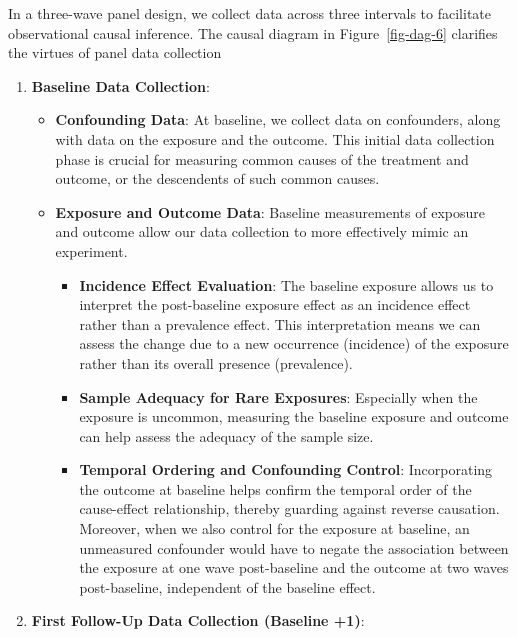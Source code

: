 \documentclass[
  singlecolumn]{article}
\begin{document}
In a three-wave panel design, we collect data across three intervals to
facilitate observational causal inference. The causal diagram in
Figure~\ref{fig-dag-6} clarifies the virtues of panel data collection

\begin{enumerate}
\def\labelenumi{\arabic{enumi}.}
\item
  \textbf{Baseline Data Collection}:

  \begin{itemize}
  \item
    \textbf{Confounding Data}: At baseline, we collect data on
    confounders, along with data on the exposure and the outcome. This
    initial data collection phase is crucial for measuring common causes
    of the treatment and outcome, or the descendents of such common
    causes.
  \item
    \textbf{Exposure and Outcome Data}: Baseline measurements of
    exposure and outcome allow our data collection to more effectively
    mimic an experiment.

    \begin{itemize}
    \item
      \textbf{Incidence Effect Evaluation}: The baseline exposure allows
      us to interpret the post-baseline exposure effect as an incidence
      effect rather than a prevalence effect. This interpretation means
      we can assess the change due to a new occurrence (incidence) of
      the exposure rather than its overall presence (prevalence).
    \item
      \textbf{Sample Adequacy for Rare Exposures}: Especially when the
      exposure is uncommon, measuring the baseline exposure and outcome
      can help assess the adequacy of the sample size.
    \item
      \textbf{Temporal Ordering and Confounding Control}: Incorporating
      the outcome at baseline helps confirm the temporal order of the
      cause-effect relationship, thereby guarding against reverse
      causation. Moreover, when we also control for the exposure at
      baseline, an unmeasured confounder would have to negate the
      association between the exposure at one wave post-baseline and the
      outcome at two waves post-baseline, independent of the baseline
      effect.
    \end{itemize}
  \end{itemize}
\item
  \textbf{First Follow-Up Data Collection (Baseline +1)}:


\end{enumerate}
\end{document}
